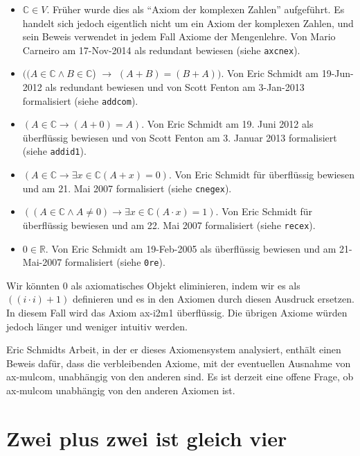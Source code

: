 \begin{itemize}
\item
  $\mathbb{C} \in V$.
  Früher wurde dies als "`Axiom der komplexen Zahlen"' aufgeführt.   Es handelt sich jedoch eigentlich nicht um ein Axiom der komplexen Zahlen, und sein Beweis verwendet in jedem Fall Axiome der Mengenlehre.   Von Mario Carneiro am 17-Nov-2014 als redundant bewiesen (siehe \texttt{axcnex}).
\item
  $((A \in \mathbb{C} \land B \in \mathbb{C}$) $\rightarrow$
  $(A + B) = (B + A))$.
  Von Eric Schmidt am 19-Jun-2012 als redundant bewiesen und von Scott Fenton am 3-Jan-2013 formalisiert (siehe \texttt{addcom}).
\item
  $(A \in \mathbb{C} \rightarrow (A + 0) = A)$.
  Von Eric Schmidt am 19. Juni 2012 als überflüssig bewiesen und von Scott Fenton am 3. Januar 2013 formalisiert (siehe \texttt{addid1}).
\item
  $(A \in \mathbb{C} \rightarrow \exists x \in \mathbb{C} (A + x) = 0)$.
  Von Eric Schmidt für überflüssig bewiesen und am 21. Mai 2007 formalisiert (siehe \texttt{cnegex}).
\item
  $((A \in \mathbb{C} \land A \ne 0) \rightarrow \exists x \in \mathbb{C} (A \cdot x) = 1)$.
  Von Eric Schmidt für überflüssig bewiesen und am 22. Mai 2007 formalisiert (siehe \texttt{recex}).
\item
  $0 \in \mathbb{R}$.
  Von Eric Schmidt am 19-Feb-2005 als überflüssig bewiesen und am 21-Mai-2007 formalisiert (siehe \texttt{0re}).
\end{itemize}

Wir könnten 0 als axiomatisches Objekt eliminieren, indem wir es als $( ( i \cdot i ) + 1 )$ definieren und es in den Axiomen durch diesen Ausdruck ersetzen. In diesem Fall wird das Axiom ax-i2m1 überflüssig. Die übrigen Axiome würden jedoch länger und weniger intuitiv werden.

Eric Schmidts Arbeit, in der er dieses Axiomensystem\cite{Schmidt} analysiert, enthält einen Beweis dafür, dass die verbleibenden Axiome, mit der eventuellen Ausnahme von ax-mulcom, unabhängig von den anderen sind. Es ist derzeit eine offene Frage, ob ax-mulcom unabhängig von den anderen Axiomen ist.

\section{Zwei plus zwei ist gleich vier}\label{2p2e4}

